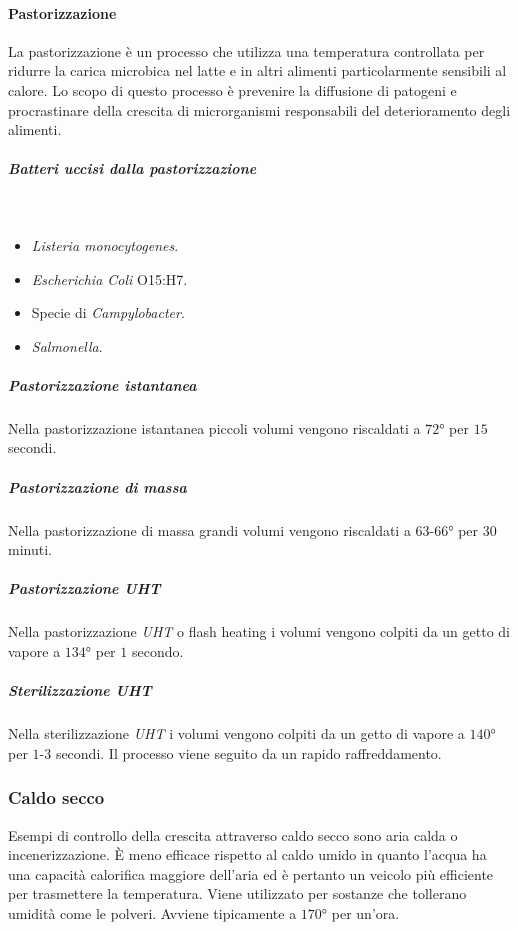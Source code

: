 			\paragraph{Pastorizzazione}
			La pastorizzazione è un processo che utilizza una temperatura controllata per ridurre la carica microbica nel latte e in altri alimenti particolarmente sensibili al calore. 
			Lo scopo di questo processo \`e prevenire la diffusione di patogeni e procrastinare della crescita di microrganismi responsabili del deterioramento degli alimenti. 
			
				\subparagraph{Batteri uccisi dalla pastorizzazione}\mbox{}\\
				\begin{multicols}{2}
					\begin{itemize}
						\item \textit{Listeria monocytogenes}.
						\item \textit{Escherichia Coli} O15:H7.
						\item Specie di \textit{Campylobacter}.
						\item \textit{Salmonella}.
					\end{itemize}
				\end{multicols}

				\subparagraph{Pastorizzazione istantanea}
				Nella pastorizzazione istantanea piccoli volumi vengono riscaldati a $72\si{\degree}$ per $15$ secondi.

				\subparagraph{Pastorizzazione di massa}
				Nella pastorizzazione di massa grandi volumi vengono riscaldati a $63$-$66\si{\degree}$ per $30$ minuti.

				\subparagraph{Pastorizzazione \emph{UHT}}
				Nella pastorizzazione \emph{UHT} o flash heating i volumi vengono colpiti da un getto di vapore a $134\si{\degree}$ per $1$ secondo.

				\subparagraph{Sterilizzazione \emph{UHT}}
				Nella sterilizzazione \emph{UHT} i volumi vengono colpiti da un getto di vapore a $140\si{\degree}$ per $1$-$3$ secondi.
				Il processo viene seguito da un rapido raffreddamento.
		
		\subsubsection{Caldo secco}
		Esempi di controllo della crescita attraverso caldo secco sono aria calda o incenerizzazione.
		\`E meno efficace rispetto al caldo umido in quanto l'acqua ha una capacit\`a calorifica maggiore dell'aria ed \`e pertanto un veicolo pi\`u efficiente per trasmettere la temperatura.
		Viene utilizzato per sostanze che tollerano umidit\`a come le polveri.
		Avviene tipicamente a $170\si{\degree}$ per un'ora.

